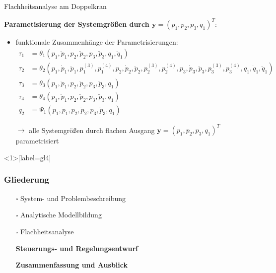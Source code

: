 \documentclass[
	ngerman,
	10pt,				%
	aspectratio=169 	%
]{beamer}
\newcommand{\cdbox}{$\square$\hspace{-0.65em}\raisebox{0.1em}{\checkmark}\hspace{-0.18em}}
\begin{document}

\begin{frame}[t,fragile,label=Flachheit_Doppelkran_2]{\large Flachheitsanalyse am Doppelkran}
	
	\textbf{Parametisierung der Systemgrößen durch $\mathbf{y} = (p_1, p_2, p_3, q_1)^T:$}
		
	\begin{itemize}
		\item funktionale Zusammenhänge der Parametrisierungen:
		\begin{align*}
			\tau_1 &= \theta_1 \left(p_1, \ddot{p}_1, p_2, \ddot{p}_2, p_3, \ddot{p}_3, q_1, \ddot{q}_1 \right) \\
			\tau_2 &= \theta_2 \left(p_1, \dot{p}_1, \ddot{p}_1, p_1^{(3)}, p_1^{(4)}, p_2, \dot{p}_2, \ddot{p}_2, p_2^{(3)}, p_2^{(4)}, p_3, \dot{p}_3, \ddot{p}_3, p_3^{(3)}, p_3^{(4)}, q_1, \dot{q}_1, \ddot{q}_1 \right) \\
			\tau_3 &= \theta_3 \left(p_1, \ddot{p}_1, p_2, \ddot{p}_2, p_3, \ddot{p}_3, q_1 \right) \\
			\tau_4 &= \theta_4 \left(p_1, \ddot{p}_1, p_2, \ddot{p}_2, p_3, \ddot{p}_3, q_1 \right) \\
			q_2 &= \Psi_1 \left(p_1, \ddot{p}_1, p_2, \ddot{p}_2, p_3, \ddot{p}_3, q_1 \right)
		\end{align*}
		\pause
		\item[$\rightarrow$] alle Systemgrößen durch flachen Ausgang $\mathbf{y} = (p_1, p_2, p_3, q_1)^T$ parametrisiert
	\end{itemize}
		
\end{frame}


\begin{frame}<1>[label=gl4]
	\frametitle{Gliederung}
	\begin{itemize}
		\item[\cdbox] System- und Problembeschreibung
		\item[\cdbox] Analytische Modellbildung
		\item[\cdbox] Flachheitsanalyse
		\item[\only<1>{$\rightarrow$}\only<2>{$\rightarrow$}\only<4->{\cdbox}]
		\textbf<1>{Steuerungs- und Regelungsentwurf}
		\item[\only<1-2>{$\square$}\only<3>{$\rightarrow$}\only<4->{\cdbox}]
		\textbf<3>{Zusammenfassung und Ausblick}
	\end{itemize}
\end{frame}
\end{document}
